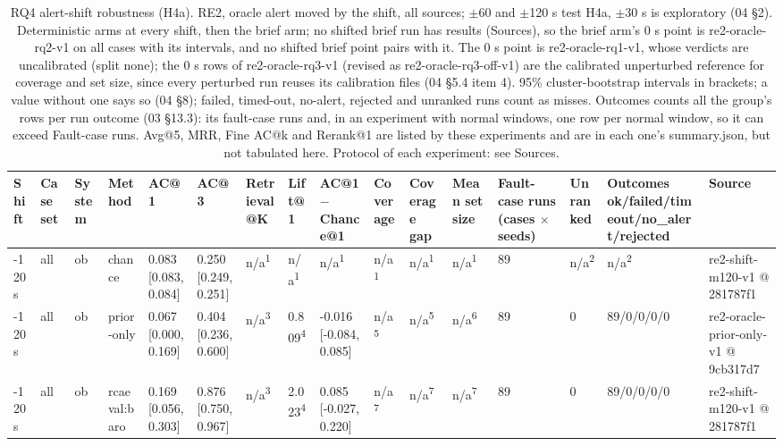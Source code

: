 \begin{table}[t]
\centering
\caption{RQ4 alert-shift robustness (H4a). RE2, oracle alert moved by the shift, all sources; $\pm$60 and $\pm$120 s test H4a, $\pm$30 s is exploratory (04 \S{}2). Deterministic arms at every shift, then the brief arm; no shifted brief run has results (Sources), so the brief arm's 0 s point is re2-oracle-rq2-v1 on all cases with its intervals, and no shifted brief point pairs with it. The 0 s point is re2-oracle-rq1-v1, whose verdicts are uncalibrated (split none); the 0 s rows of re2-oracle-rq3-v1 (revised as re2-oracle-rq3-off-v1) are the calibrated unperturbed reference for coverage and set size, since every perturbed run reuses its calibration files (04 \S{}5.4 item 4). 95\% cluster-bootstrap intervals in brackets; a value without one says so (04 \S{}8); failed, timed-out, no-alert, rejected and unranked runs count as misses. Outcomes counts all the group's rows per run outcome (03 \S{}13.3): its fault-case runs and, in an experiment with normal windows, one row per normal window, so it can exceed Fault-case runs. Avg@5, MRR, Fine AC@k and Rerank@1 are listed by these experiments and are in each one's summary.json, but not tabulated here. Protocol of each experiment: see Sources.}
\label{tab:t10-rq4-shift}
\small
\begin{tabular}{llllllllllllllll}
\hline
Shift & Case set & System & Method & AC@1 & AC@3 & Retrieval@K & Lift@1 & AC@1 $-$ Chance@1 & Coverage & Coverage gap & Mean set size & Fault-case runs (cases $\times$ seeds) & Unranked & Outcomes ok/failed/timeout/no\_alert/rejected & Source \\
\hline
-120 s & all & ob & chance & 0.083 [0.083, 0.084] & 0.250 [0.249, 0.251] & n/a\textsuperscript{1} & n/a\textsuperscript{1} & n/a\textsuperscript{1} & n/a\textsuperscript{1} & n/a\textsuperscript{1} & n/a\textsuperscript{1} & 89 & n/a\textsuperscript{2} & n/a\textsuperscript{2} & re2-shift-m120-v1 @ 281787f1 \\
-120 s & all & ob & prior-only & 0.067 [0.000, 0.169] & 0.404 [0.236, 0.600] & n/a\textsuperscript{3} & 0.809\textsuperscript{4} & -0.016 [-0.084, 0.085] & n/a\textsuperscript{5} & n/a\textsuperscript{5} & n/a\textsuperscript{6} & 89 & 0 & 89/0/0/0/0 & re2-oracle-prior-only-v1 @ 9cb317d7 \\
-120 s & all & ob & rcaeval:baro & 0.169 [0.056, 0.303] & 0.876 [0.750, 0.967] & n/a\textsuperscript{3} & 2.023\textsuperscript{4} & 0.085 [-0.027, 0.220] & n/a\textsuperscript{7} & n/a\textsuperscript{7} & n/a\textsuperscript{7} & 89 & 0 & 89/0/0/0/0 & re2-shift-m120-v1 @ 281787f1 \\

\end{tabular}
\end{table}
